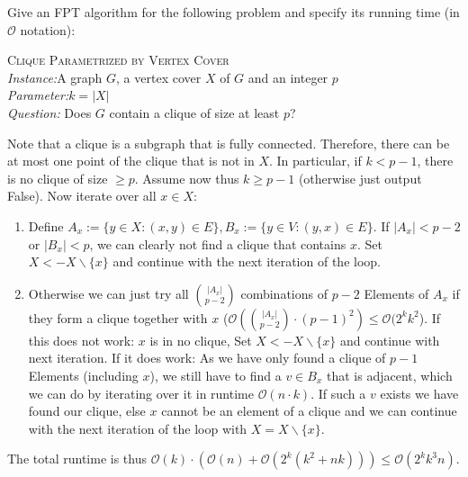 \documentclass{article}
\begin{document}
\begin{exercise}
    Give an FPT algorithm for the following problem and specify its running time (in $\mathcal O$ notation):
    \begin{mdframed} \textsc{Clique Parametrized by Vertex Cover} \\
        \textit{Instance:}A graph $G$, a vertex cover $X$ of $G$ and an integer $p$\\
\textit{Parameter:}$k = |X|$\\
\textit{Question:} Does $G$ contain a clique of size at least $p$?
  \end{mdframed}
\end{exercise}
\begin{solving}
    Note that a clique is a subgraph that is fully connected. Therefore, there can be at most one point of the clique that is not in $X$. In particular, if $k<p-1$, there is no clique of size $\geq p$. Assume now thus $k\geq p-1$ (otherwise just output False). Now iterate over all $x\in X$:\begin{enumerate}
        \item Define $A_x:= \{y\in X: (x,y)\in E\}, B_x := \{y\in V: (y,x)\in E\}$. If $|A_x|< p-2$ or $|B_x|<p$, we can clearly not find a clique that contains $x$. Set $X <- X\backslash\{x\}$ and continue with the next iteration of the loop.
        \item Otherwise we can just try all $\binom{|A_x|}{p-2}$ combinations of $p-2$ Elements of $A_x$ if they form a clique together with $x$ ($\mathcal O(\binom{|A_x|}{p-2}\cdot (p-1)^2)\leq \mathcal O(2^kk^2$). If this does not work: $x$ is in no clique, Set $X<- X\backslash\{x\}$ and continue with next iteration. If it does work: As we have only found a clique of $p-1$ Elements (including $x$), we still have to find a $v\in B_x$ that is adjacent, which we can do by iterating over it in runtime $\mathcal O(n\cdot k)$. If such a $v$ exists we have found our clique, else $x$ cannot be an element of a clique and we can continue with the next iteration of the loop with $X = X\backslash\{x\}$.
    \end{enumerate}
The total runtime is thus $\mathcal O(k)\cdot (\mathcal O(n) + \mathcal O(2^k (k^2+ nk))) \leq \mathcal O(2^k k^3n).$
\end{solving}
\newpage
\end{document}
